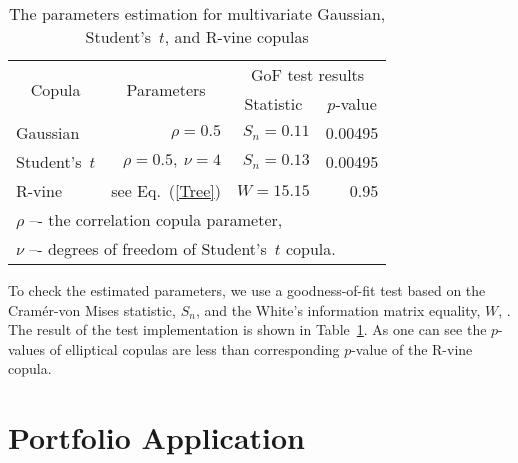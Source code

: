 \documentclass{llncs}
\begin{document}
\begin{table}[t]
\centering
\caption{The parameters estimation for multivariate Gaussian, Student's~$t$, and R-vine copulas}
\label{CopPars}
\setlength{\tabcolsep}{8pt}
\begin{tabular}{l|r|rr}
\hline
\multicolumn{1}{c}{\multirow{2}{*}{Copula}} & \multicolumn{1}{c}{\multirow{2}{*}{Parameters}} & \multicolumn{2}{c}{GoF test results} \bigstrut \\ \cline{3-4}
\multicolumn{1}{c}{} & \multicolumn{1}{c}{} & \multicolumn{1}{c}{Statistic} & \multicolumn{1}{c}{$p$-value} \bigstrut \\ \hline
Gaussian      & $\rho=0.5$           & $S_n=0.11$  & 0.00495  \bigstrut \\
Student's~$t$ & $\rho=0.5,\ \nu=4$   & $S_n=0.13$  & 0.00495  \bigstrut \\
R-vine        & see Eq.~(\ref{Tree}) & $W=15.15$   & 0.95    \bigstrut \\ \hline
\multicolumn{4}{l}{$\rho$ –- the correlation copula parameter,} \bigstrut[t] \\
\multicolumn{4}{l}{$\nu$ –- degrees of freedom of Student's~$t$ copula.} \bigstrut[b]
\end{tabular}
\end{table}

To check the estimated parameters, we use a goodness-of-fit test based on the Cram\'er-von Mises statistic, $S_n$,  \cite{Koj2010} and the White’s information matrix equality, $W$, \cite{White1982}. 
The result of the test implementation is shown in Table~\ref{CopPars}. As one can see the $p$-values of elliptical copulas are less than corresponding $p$-value of the R-vine copula.



\section{Portfolio Application}\label{PortApp}
\end{document}
